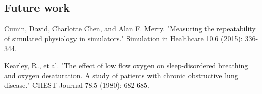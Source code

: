 \documentclass[a4paper]{article}
\begin{document}
\subsection{Future work}

\begin{thebibliography}{1}

   Cumin, David, Charlotte Chen, and Alan F. Merry. "Measuring the repeatability of simulated physiology in simulators." Simulation in Healthcare 10.6 (2015): 336-344.

  Kearley, R., et al. "The effect of low flow oxygen on sleep-disordered breathing and oxygen desaturation. A study of patients with chronic obstructive lung disease." CHEST Journal 78.5 (1980): 682-685.  



  \end{thebibliography}
\end{document}

